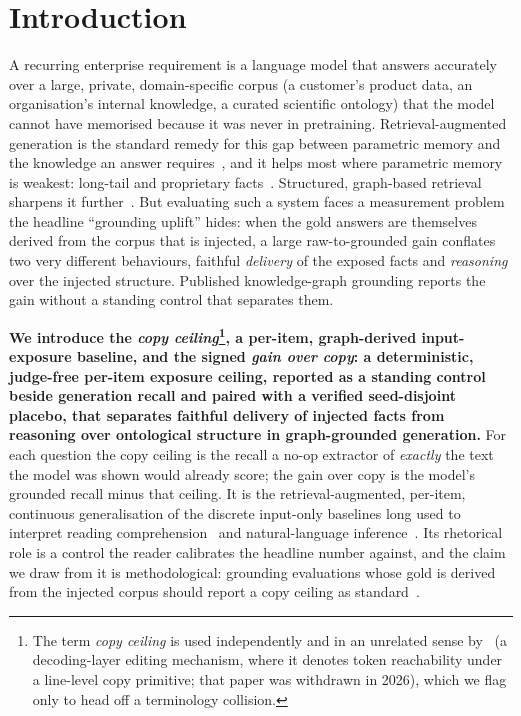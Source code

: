 \documentclass[10pt,twocolumn]{article}
\begin{document}
\section{Introduction}\label{sec:intro}
A recurring enterprise requirement is a language model that answers accurately over a large,
private, domain-specific corpus (a customer's product data, an organisation's internal
knowledge, a curated scientific ontology) that the model cannot have memorised because it was
never in pretraining. Retrieval-augmented generation is the standard remedy for this gap between
parametric memory and the knowledge an answer requires~\cite{lewis2020rag,gao2023ragsurvey}, and
it helps most where parametric memory is weakest: long-tail and proprietary
facts~\cite{mallen2023trust}. Structured, graph-based retrieval sharpens it
further~\cite{edge2024graphrag,guo2024lightrag,baek2023kaping,pan2024unifying}. But evaluating such
a system faces a measurement problem the headline ``grounding uplift'' hides: when the gold
answers are themselves derived from the corpus that is injected, a large raw-to-grounded gain
conflates two very different behaviours, faithful \emph{delivery} of the exposed facts and
\emph{reasoning} over the injected structure. Published knowledge-graph grounding reports the gain
without a standing control that separates them.

\textbf{We introduce the \emph{copy ceiling}\footnote{The term \emph{copy ceiling} is used
independently and in an unrelated sense by~\textcite{copyasdecode2026} (a decoding-layer editing
mechanism, where it denotes token reachability under a line-level copy primitive; that paper was
withdrawn in 2026), which we flag only to head off a terminology collision.}, a per-item,
graph-derived input-exposure baseline, and the signed \emph{gain over copy}: a deterministic,
judge-free per-item exposure ceiling, reported as a standing control beside generation recall and
paired with a verified seed-disjoint placebo, that separates faithful delivery of injected facts from
reasoning over ontological structure in graph-grounded generation.} For each
question the copy ceiling is the recall a no-op extractor of \emph{exactly} the text the model was
shown would already score; the gain over copy is the model's grounded recall minus that ceiling.
It is the retrieval-augmented, per-item, continuous generalisation of the discrete input-only
baselines long used to interpret reading comprehension~\cite{kaushik2018reading} and
natural-language inference~\cite{gururangan2018artifacts,poliak2018hypothesis}. Its rhetorical role
is a control the reader calibrates the headline number against, and the claim we draw from it is
methodological: grounding evaluations whose gold is derived from the injected corpus should report
a copy ceiling as standard~\cite{laitenberger2025stronger,min2023factscore}.
\end{document}
